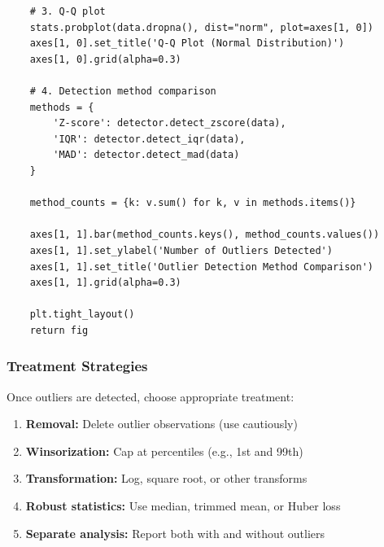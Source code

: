 \begin{lstlisting}
    # 3. Q-Q plot
    stats.probplot(data.dropna(), dist="norm", plot=axes[1, 0])
    axes[1, 0].set_title('Q-Q Plot (Normal Distribution)')
    axes[1, 0].grid(alpha=0.3)

    # 4. Detection method comparison
    methods = {
        'Z-score': detector.detect_zscore(data),
        'IQR': detector.detect_iqr(data),
        'MAD': detector.detect_mad(data)
    }

    method_counts = {k: v.sum() for k, v in methods.items()}

    axes[1, 1].bar(method_counts.keys(), method_counts.values())
    axes[1, 1].set_ylabel('Number of Outliers Detected')
    axes[1, 1].set_title('Outlier Detection Method Comparison')
    axes[1, 1].grid(alpha=0.3)

    plt.tight_layout()
    return fig
\end{lstlisting}

\subsubsection{Treatment Strategies}

Once outliers are detected, choose appropriate treatment:

\begin{enumerate}
    \item \textbf{Removal:} Delete outlier observations (use cautiously)
    \item \textbf{Winsorization:} Cap at percentiles (e.g., 1st and 99th)
    \item \textbf{Transformation:} Log, square root, or other transforms
    \item \textbf{Robust statistics:} Use median, trimmed mean, or Huber loss
    \item \textbf{Separate analysis:} Report both with and without outliers
\end{enumerate}

